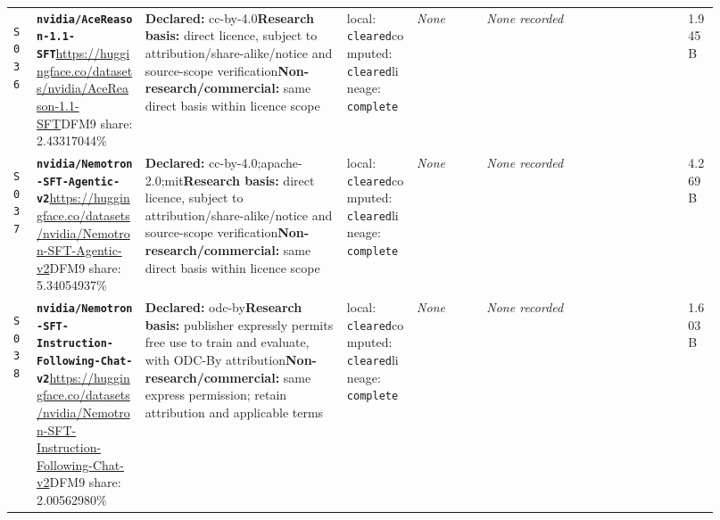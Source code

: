 \documentclass[9pt,a4paper]{article}
\newcommand{\srcid}[1]{\hypertarget{src:#1}{\texttt{#1}}}
\begin{document}
\begin{landscape}
\begin{longtable}{@{}L{0.03\linewidth}L{0.14\linewidth}L{0.26\linewidth}L{0.09\linewidth}L{0.09\linewidth}L{0.265\linewidth}L{0.045\linewidth}@{}}
\srcid{S036} & \textbf{\nolinkurl{nvidia/AceReason-1.1-SFT}}\newline \url{https://huggingface.co/datasets/nvidia/AceReason-1.1-SFT}\newline DFM9 share: 2.43317044\% & \textbf{Declared:} cc-by-4.0\newline \textbf{Research basis:} direct licence, subject to attribution/share-alike/notice and source-scope verification\newline \textbf{Non-research/commercial:} same direct basis within licence scope & local: \texttt{cleared}\newline computed: \texttt{cleared}\newline lineage: \texttt{complete} & \textit{None} & \textit{None recorded} & 1.945B \\
\srcid{S037} & \textbf{\nolinkurl{nvidia/Nemotron-SFT-Agentic-v2}}\newline \url{https://huggingface.co/datasets/nvidia/Nemotron-SFT-Agentic-v2}\newline DFM9 share: 5.34054937\% & \textbf{Declared:} cc-by-4.0;apache-2.0;mit\newline \textbf{Research basis:} direct licence, subject to attribution/share-alike/notice and source-scope verification\newline \textbf{Non-research/commercial:} same direct basis within licence scope & local: \texttt{cleared}\newline computed: \texttt{cleared}\newline lineage: \texttt{complete} & \textit{None} & \textit{None recorded} & 4.269B \\
\srcid{S038} & \textbf{\nolinkurl{nvidia/Nemotron-SFT-Instruction-Following-Chat-v2}}\newline \url{https://huggingface.co/datasets/nvidia/Nemotron-SFT-Instruction-Following-Chat-v2}\newline DFM9 share: 2.00562980\% & \textbf{Declared:} odc-by\newline \textbf{Research basis:} publisher expressly permits free use to train and evaluate, with ODC-By attribution\newline \textbf{Non-research/commercial:} same express permission; retain attribution and applicable terms & local: \texttt{cleared}\newline computed: \texttt{cleared}\newline lineage: \texttt{complete} & \textit{None} & \textit{None recorded} & 1.603B \\

\end{longtable}
\end{landscape}
\end{document}

